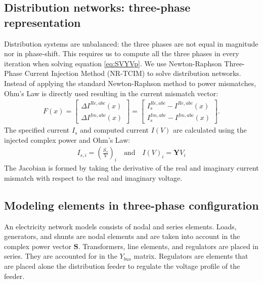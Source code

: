 \documentclass[10pt,journal]{article}
\begin{document}
\subsection{Distribution networks: three-phase representation}
Distribution systems are unbalanced: the three phases are not equal in magnitude nor in phase-shift. This requires us to compute all the three phases in every iteration when solving equation \eqref{eq:SVYVp}. We use Newton-Raphson Three-Phase Current Injection Method (NR-TCIM) \cite{Garcia2000} to solve distribution networks. Instead of applying the standard Newton-Raphson method to power mismatches, Ohm's Law  is directly used resulting in the current mismatch vector: 
\begin{align}
     {F}({x})=\begin{bmatrix}
                \Delta {I}^{Re,abc}({x})\\ 
                \Delta {I}^{Im,abc}({x}) 
               \end{bmatrix}  = \begin{bmatrix}
   {I}_s^{Re,abc} - {I}^{Re,abc}({x}) \\
   {I}_s^{Im,abc} - {I}^{Im,abc}({x})
               \end{bmatrix}.
    \label{eq:curmism}
\end{align}
The specified current ${I_s}$ and computed current ${I}\left({V}\right)$ are calculated using the injected complex power and Ohm's Law: 
\begin{align}
    {I_{s,i}} = \left(\frac{\overline{S_s}}{V}\right)_i\quad\mbox{and}\quad I(V)_i = \mathbf{Y}V_i 
\end{align}
The Jacobian is formed by taking the derivative of the real and imaginary current mismatch with respect to the real and imaginary voltage.
\subsection{Modeling elements in three-phase configuration}
An electricity network models consists of nodal and series elements. Loads, generators, and shunts are nodal elements and are taken into account in the complex power vector $\mathbf{S}$. Transformers, line elements, and regulators are placed in series. They are accounted for in the $Y_{bus}$ matrix. Regulators are elements that are placed alone the distribution feeder to regulate the voltage profile of the feeder.  
\end{document}
